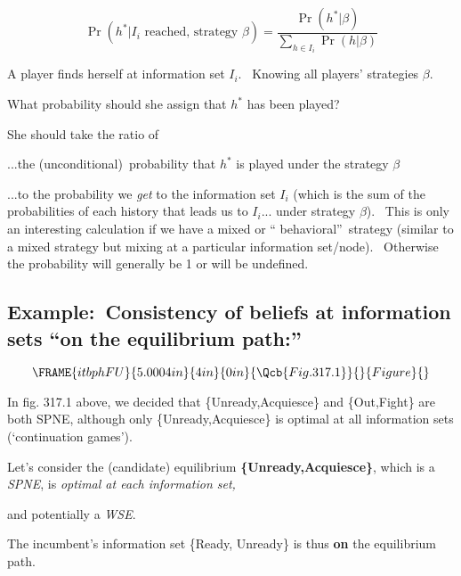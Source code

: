 \documentclass{article}
\begin{document}
\[
\Pr (h^{\ast }|I_{i}\text{ reached, strategy }\beta )=\frac{\Pr (h^{\ast
}|\beta )}{\sum\limits_{h\in I_{i}}\Pr (h|\beta )}
\]

A player finds herself at information set $I_{i}$. \ Knowing all players'
strategies $\beta $. \ 

What probability should she assign that $h^{\ast }$ has been played? \ 

She should take the ratio of

...the (unconditional)\ probability that $h^{\ast }$ is played under the
strategy $\beta $ \ 

...to the probability we \textit{get }to the information set $I_{i}$ (which
is the sum of the probabilities of each history that leads us to $I_{i}$...
under strategy $\beta $). \ {\footnotesize This is only an interesting
calculation if we have a mixed or \textquotedblleft
behavioral\textquotedblright\ strategy (similar to a mixed strategy but
mixing at a particular information set/node). \ Otherwise the probability
will generally be 1 or will be undefined.}

\bigskip 

\subsection{Example:\ Consistency of beliefs at information sets
\textquotedblleft on the equilibrium path:\textquotedblright }

\[
\FRAME{itbphFU}{5.0004in}{4in}{0in}{\Qcb{Fig. 317.1}}{}{Figure}{\special%
{language "Scientific Word";type "GRAPHIC";maintain-aspect-ratio
TRUE;display "USEDEF";valid_file "T";width 5.0004in;height 4in;depth
0in;original-width 5.6886in;original-height 3.5201in;cropleft "0";croptop
"1";cropright "1";cropbottom "0";tempfilename
'JSH9C61Z.wmf';tempfile-properties "XPR";}}
\]

In fig. 317.1 above, we decided that \{Unready,Acquiesce\} and \{Out,Fight\}
are both SPNE, although only \{Unready,Acquiesce\} is optimal at all
information sets (`continuation games').

\bigskip 

Let's consider the (candidate) equilibrium \textbf{\{Unready,Acquiesce\}},
which is a \textit{SPNE}, is \textit{optimal at each information set,}

and potentially a \textit{WSE}.

\bigskip 

The incumbent's information set \{Ready, Unready\} is thus \textbf{on} the
equilibrium path. \ 
\end{document}
